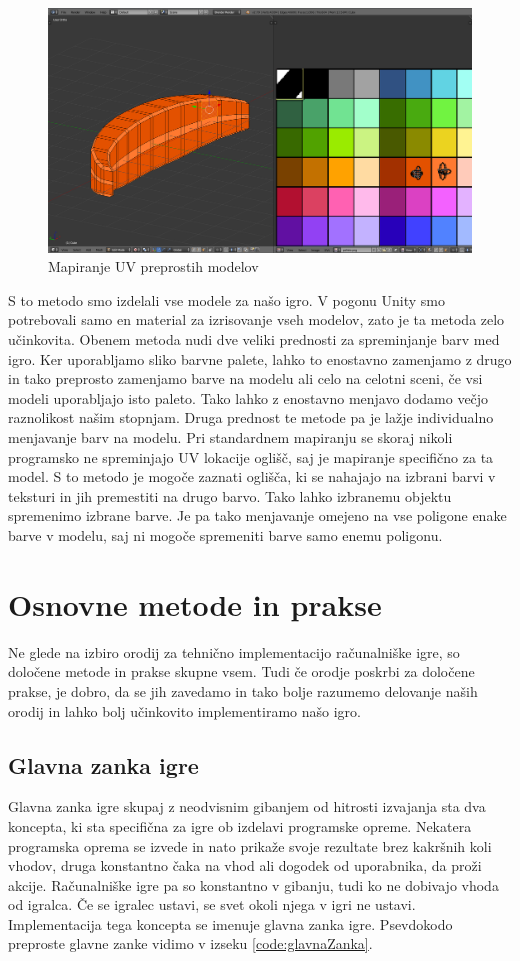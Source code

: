 \documentclass[12pt,a4paper,twoside]{book}
\begin{document}
\begin{figure}[h]
	\centering
	\includegraphics[width=14cm]{texturePalette}
	\caption{Mapiranje UV preprostih modelov}
	\label{slika:texturePalette}
\end{figure}

S to metodo smo izdelali vse modele za našo igro. V pogonu Unity smo potrebovali samo en material za izrisovanje vseh modelov, zato je ta metoda zelo učinkovita. Obenem metoda nudi dve veliki prednosti za spreminjanje barv med igro. Ker uporabljamo sliko barvne palete, lahko to enostavno zamenjamo z drugo in tako preprosto zamenjamo barve na modelu ali celo na celotni sceni, če vsi modeli uporabljajo isto paleto. Tako lahko z enostavno menjavo dodamo večjo raznolikost našim stopnjam. Druga prednost te metode pa je lažje individualno menjavanje barv na modelu. Pri standardnem mapiranju se skoraj nikoli programsko ne spreminjajo UV lokacije oglišč, saj je mapiranje specifično za ta model. S to metodo je mogoče zaznati oglišča, ki se nahajajo na izbrani barvi v teksturi in jih premestiti na drugo barvo. Tako lahko izbranemu objektu spremenimo izbrane barve. Je pa tako menjavanje omejeno na vse poligone enake barve v modelu, saj ni mogoče spremeniti barve samo enemu poligonu.

\section{Osnovne metode in prakse}
Ne glede na izbiro orodij za tehnično implementacijo računalniške igre, so določene metode in prakse skupne vsem. Tudi če orodje poskrbi za določene prakse, je dobro, da se jih zavedamo in tako bolje razumemo delovanje naših orodij in lahko bolj učinkovito implementiramo našo igro.

\subsection{Glavna zanka igre}
Glavna zanka igre skupaj z neodvisnim gibanjem od hitrosti izvajanja sta dva koncepta, ki sta specifična za igre ob izdelavi programske opreme. Nekatera programska oprema se izvede in nato prikaže svoje rezultate brez kakršnih koli vhodov, druga konstantno čaka na vhod ali dogodek od uporabnika, da proži akcije. Računalniške igre pa so konstantno v gibanju, tudi ko ne dobivajo vhoda od igralca. Če se igralec ustavi, se svet okoli njega v igri ne ustavi. Implementacija tega koncepta se imenuje glavna zanka igre. Psevdokodo preproste glavne zanke vidimo v izseku \ref{code:glavnaZanka}.
\end{document}
